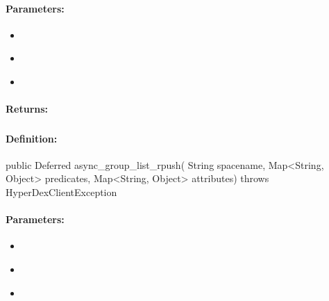 \paragraph{Parameters:}
\begin{itemize}[noitemsep]
\item {}\\

\item {}\\

\item {}\\

\end{itemize}

\paragraph{Returns:}


\pagebreak
\subsubsection{}
\label{api:java:async_group_list_rpush}


\paragraph{Definition:}
\begin{javacode}
public Deferred async_group_list_rpush(
        String spacename,
        Map<String, Object> predicates,
        Map<String, Object> attributes) throws HyperDexClientException
\end{javacode}

\paragraph{Parameters:}
\begin{itemize}[noitemsep]
\item {}\\

\item {}\\

\item {}\\

\end{itemize}

